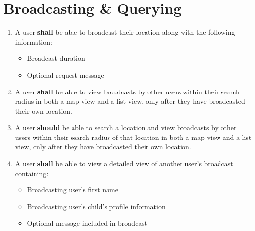 \documentclass{article}
\begin{document}
\section*{Broadcasting \& Querying}
	\begin{enumerate}
		\setcounter{enumi}{\theenumTemp}
		\item A user \textbf{shall} be able to broadcast their location along with the following information:
		\begin{itemize}
			\item Broadcast duration
			\item Optional request message
		\end{itemize}
		\item A user \textbf{shall} be able to view broadcasts by other users within their search radius in both a map view and a list view, only after they have broadcasted their own location.
		\item A user \textbf{should} be able to search a location and view broadcasts by other users within their search radius of that location in both a map view and a list view, only after they have broadcasted their own location.
		\item A user \textbf{shall} be able to view a detailed view of another user's broadcast containing:
			\begin{itemize}
				\item Broadcasting user's first name
				\item Broadcasting user's child's profile information
				\item Optional message included in broadcast
			\end{itemize}

		\setcounter{enumTemp}{\theenumi}
	\end{enumerate}
\end{document}

